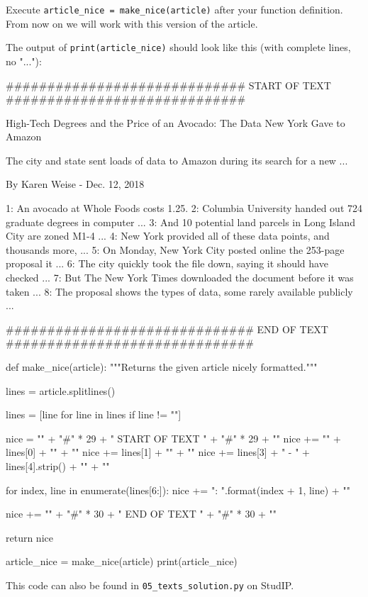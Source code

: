 \noindent Execute \texttt{article\_nice = make\_nice(article)} after your function definition. From now on we will work with this version of the article.

\noindent The output of \texttt{print(article\_nice)} should look like this (with complete lines, no "..."):

\begin{outputcode}

############################# START OF TEXT #############################

High-Tech Degrees and the Price of an Avocado: The Data New York Gave to Amazon

The city and state sent loads of data to Amazon during its search for a new ...

By Karen Weise - Dec. 12, 2018

1: An avocado at Whole Foods costs 1.25. 
2: Columbia University handed out 724 graduate degrees in computer ...
3: And 10 potential land parcels in Long Island City are zoned M1-4 ...
4: New York provided all of these data points, and thousands more, ...
5: On Monday, New York City posted online the 253-page proposal it ...
6: The city quickly took the file down, saying it should have checked ...
7: But The New York Times downloaded the document before it was taken ...
8: The proposal shows the types of data, some rarely available publicly ...

############################## END OF TEXT ##############################


\end{outputcode}

\vspace{1em}

\begin{solution}

    \begin{pythoncode}

def make_nice(article):
    """Returns the given article nicely formatted."""

    lines = article.splitlines()

    lines = [line for line in lines if line != ""]

    nice = "\n" + "#" * 29 + " START OF TEXT " + "#" * 29 + "\n"
    nice += "\n" + lines[0] + "\n" + "\n"
    nice += lines[1] + "\n"  + "\n"
    nice += lines[3] + " - " + lines[4].strip() + "\n" + "\n"

    for index, line in enumerate(lines[6:]):
          nice += "{}: {}".format(index + 1, line) + "\n"

    nice += "\n" + "#" * 30 + " END OF TEXT " + "#" * 30 + "\n"
  
    return nice

article_nice = make_nice(article)
print(article_nice)

    \end{pythoncode}

\noindent This code can also be found in \texttt{05\_texts\_solution.py} on StudIP.

\end{solution}

